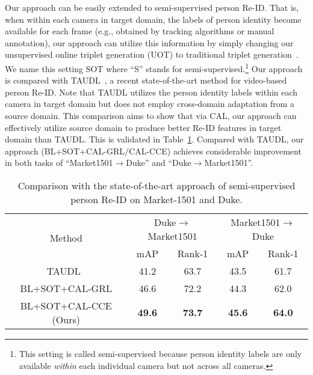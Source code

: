 \documentclass[10pt,twocolumn,letterpaper]{article}
\begin{document}
Our approach can be easily extended to semi-supervised person Re-ID. That is, when within each camera in target domain, the labels of person identity become available for each frame (e.g., obtained by tracking algorithms or manual annotation), our approach can utilize this information by simply changing our unsupervised online triplet generation (UOT) to traditional triplet generation~\cite{hermans2017defense}. We name this setting SOT where ``S'' stands for semi-supervised.\footnote{This setting is called semi-supervised because person identity labels are only available \textit{within} each individual camera but not across all cameras.} Our approach is compared with TAUDL~\cite{Li_2018_ECCV}, a recent state-of-the-art method for video-based person Re-ID. Note that TAUDL utilizes the person identity labels within each camera in target domain but does not employ cross-domain adaptation from a source domain.
This comparison aims to show that via CAL, our approach can effectively utilize source domain to produce better Re-ID features in target domain than TAUDL. This is validated in Table~\ref{tab01}. Compared with TAUDL, our approach (BL+SOT+CAL-GRL$/$CAL-CCE) achieves considerable improvement in both tasks of ``Market1501$\rightarrow$Duke'' and ``Duke$\rightarrow$Market1501''. 


\begin{table}[htbp]
 \centering
 \caption{Comparison with the state-of-the-art approach of semi-supervised person Re-ID on Market-1501 and Duke.}
 \begin{adjustbox}{width=0.48\textwidth}
   \begin{tabular}{|c|cc|cc|}
   \toprule
   \multirow{2}[2]{*}{Method} & \multicolumn{2}{c|}{Duke$\rightarrow$Market1501} & \multicolumn{2}{c|}{Market1501$\rightarrow$Duke} \\
\cmidrule{2-5}         & mAP  & Rank-1 & mAP  & Rank-1 \\
   \midrule
   TAUDL~\cite{Li_2018_ECCV} & 41.2 & 63.7 & 43.5 & 61.7 \\
   \midrule
BL+SOT+CAL-GRL & 46.6 & 72.2 & 44.3 & 62.0 \\
   BL+SOT+CAL-CCE (Ours) & \textcolor[rgb]{ 1, 0, 0}{\textbf{49.6}} & \textcolor[rgb]{ 1, 0, 0}{\textbf{73.7}} & \textcolor[rgb]{ 1, 0, 0}{\textbf{45.6}} & \textcolor[rgb]{ 1, 0, 0}{\textbf{64.0}} \\
   \bottomrule
   \end{tabular}\end{adjustbox}
 \label{tab01}\vspace*{-15pt}
\end{table}
\end{document}
